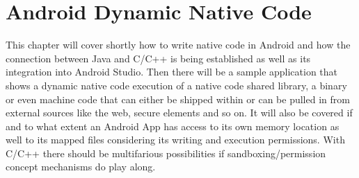 \chapter{Android Dynamic Native Code}\label{chapter:android_dynamic_native_code}

This chapter will cover shortly how to write native code in Android and how
the connection between Java and C/C++ is being established as well as its
integration into Android Studio.
Then there will be a sample application that shows a dynamic native code execution of a native code shared library, a binary or even machine code that can either be shipped within  or can be pulled in from external sources like the web, secure elements and so on. It will also be covered
if and to what extent an Android App has access to its own memory location as
well to its mapped files considering its writing and execution permissions.
With C/C++ there should be multifarious possibilities if sandboxing/permission concept mechanisms do play along.

